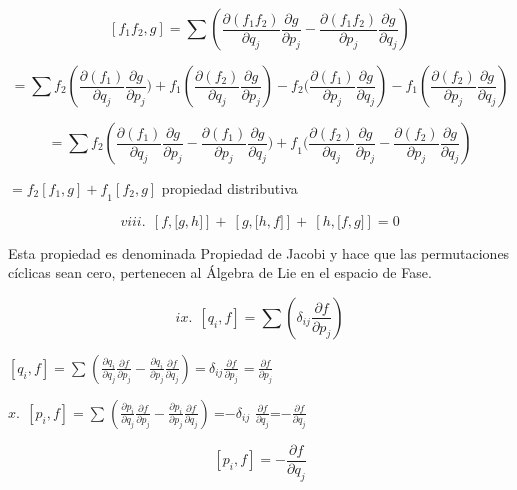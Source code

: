 \documentclass[]{article}
\begin{document}
\[\left\lbrack f_{1}f_{2},g \right\rbrack = \sum_{}^{}\left( \frac{\partial(f_{1}f_{2})}{\partial q_{j}}\frac{\partial g}{\partial p_{j}} - \frac{\partial(f_{1}f_{2})}{\partial p_{j}}\frac{\partial g}{\partial q_{j}} \right)\]

\[= \sum_{}^{}{f_{2}\left( \frac{\partial(f_{1})}{\partial q_{j}}\frac{\partial g}{\partial p_{j}}) + f_{1}(\frac{\partial(f_{2})}{\partial q_{j}}\frac{\partial g}{\partial p_{j}}) - f_{2}(\frac{\partial(f_{1})}{\partial p_{j}}\frac{\partial g}{\partial q_{j}} \right)} - f_{1}(\frac{\partial\left( f_{2} \right)}{\partial p_{j}}\frac{\partial g}{\partial q_{j}})\]

\[= \sum_{}^{}{f_{2}\left( \frac{\partial(f_{1})}{\partial q_{j}}\frac{\partial g}{\partial p_{j}} - \frac{\partial(f_{1})}{\partial p_{j}}\frac{\partial g}{\partial q_{j}}{) + f}_{1}(\frac{\partial(f_{2})}{\partial q_{j}}\frac{\partial g}{\partial p_{j}} - \frac{\partial\left( f_{2} \right)}{\partial p_{j}}\frac{\partial g}{\partial q_{j}} \right)}\]

\({= f_{2}\left\lbrack f_{1},g \right\rbrack + f}_{1}\left\lbrack f_{2},g \right\rbrack\)
propiedad distributiva

\[viii.\ \ \left\lbrack f,\lbrack g,h\rbrack \right\rbrack + \ \left\lbrack g,\lbrack h,f\rbrack \right\rbrack + \ \left\lbrack h,\lbrack f,g\rbrack \right\rbrack = 0\]

Esta propiedad es denominada Propiedad de Jacobi y hace que las
permutaciones cíclicas sean cero, pertenecen al Álgebra de Lie en el
espacio de Fase.

\[ix.\ \ \left\lbrack q_{i},f \right\rbrack = \sum_{}^{}\left( \delta_{ij}\frac{\partial f}{\partial p_{j}} \right)\]

\(\left\lbrack q_{i},f \right\rbrack = \sum_{}^{}\left( \frac{\partial q_{i}}{\partial q_{j}}\frac{\partial f}{\partial p_{j}} - \frac{\partial q_{i}}{\partial p_{j}}\frac{\partial f}{\partial q_{j}} \right)\ \)=\({\ \delta}_{ij}\frac{\partial f}{\partial p_{j}}\)
=\(\ \frac{\partial f}{\partial p_{j}}\)

\(x.\ \ \left\lbrack p_{i},f \right\rbrack = \sum_{}^{}\left( \frac{\partial p_{i}}{\partial q_{j}}\frac{\partial f}{\partial p_{j}} - \frac{\partial p_{i}}{\partial p_{j}}\frac{\partial f}{\partial q_{j}} \right)\ \)=\({- \delta}_{ij}\)
\(\frac{\partial f}{\partial q_{j}}\)=\(- \frac{\partial f}{\partial q_{j}}\)

\[\left\lbrack p_{i},f \right\rbrack = - \frac{\partial f}{\partial q_{j}}\]
\end{document}
